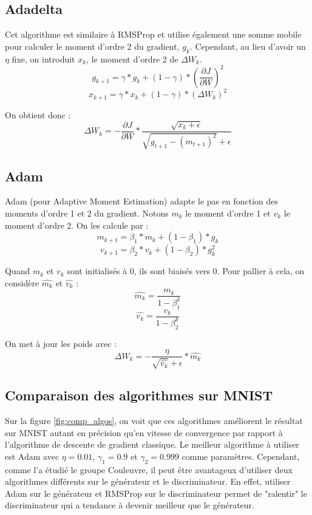 \subsection{Adadelta}
Cet algorithme est similaire à RMSProp et utilise également une somme mobile pour calculer le moment d'ordre 2 du gradient, $g_k$. Cependant, au lieu d'avoir un $\eta$ fixe, on introduit $x_k$, le moment d'ordre 2 de $\Delta W_k$.
\[g_{k+1} = \gamma*g_k + (1-\gamma)*(\frac{\partial J}{\partial W})^2\]
\[x_{k+1} = \gamma*x_k + (1-\gamma)*(\Delta W_k)^2\]

On obtient donc :
\[\Delta W_k = -\frac{\partial J}{\partial W}*\frac{\sqrt{x_k + \epsilon}}{\sqrt{g_{t+1}-(m_{t+1})^2}+\epsilon}\]
\subsection{Adam}
Adam (pour Adaptive Moment Estimation) adapte le pas en fonction des moments d'ordre 1 et 2 du gradient. Notons $m_k$ le moment d'ordre 1 et $v_k$ le moment d'ordre 2.
On les calcule par :
\[m_{k+1} = \beta_1*m_k + (1-\beta_1)*g_k\]
\[v_{k+1} = \beta_2*v_k + (1-\beta_2)*g_k^2\]

Quand $m_k$ et $v_k$ sont initialisés à 0, ils sont biaisés vers 0.
Pour pallier à cela, on considère $\widehat{m_k}$ et $\widehat{v_k}$ : 
\[\widehat{m_{k}} = \frac{m_k}{1-\beta_1^k}\]
\[\widehat{v_{k}} = \frac{v_k}{1-\beta_2^k}\]

On met à jour les poids avec :
\[\Delta W_k = -\frac{\eta}{\sqrt{\widehat{v_k}}+\epsilon}*\widehat{m_k}\]

\subsection{Comparaison des algorithmes sur MNIST}

	Sur la figure \ref{fig:comp_algos}, on voit que ces algorithmes améliorent le résultat sur MNIST autant en précision qu'en vitesse de convergence par rapport à l'algorithme de descente de gradient classique. Le meilleur algorithme à utiliser est Adam avec $\eta = 0.01$, $\gamma_1=0.9$ et $\gamma_2 = 0.999$ comme paramètres. Cependant, comme l'a étudié le groupe Couleuvre, il peut être avantageux d'utiliser deux algorithmes différents sur le générateur et le discriminateur. En effet, utiliser Adam sur le générateur et RMSProp sur le discriminateur permet de "ralentir" le discriminateur qui a tendance à devenir meilleur que le générateur. 
	

